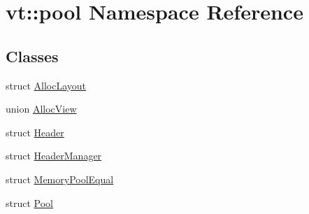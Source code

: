 \hypertarget{namespacevt_1_1pool}{}\section{vt\+:\+:pool Namespace Reference}
\label{namespacevt_1_1pool}
\subsection*{Classes}
\begin{DoxyCompactItemize}
\item 
struct \hyperlink{structvt_1_1pool_1_1_alloc_layout}{Alloc\+Layout}
\item 
union \hyperlink{unionvt_1_1pool_1_1_alloc_view}{Alloc\+View}
\item 
struct \hyperlink{structvt_1_1pool_1_1_header}{Header}
\item 
struct \hyperlink{structvt_1_1pool_1_1_header_manager}{Header\+Manager}
\item 
struct \hyperlink{structvt_1_1pool_1_1_memory_pool_equal}{Memory\+Pool\+Equal}
\item 
struct \hyperlink{structvt_1_1pool_1_1_pool}{Pool}
\end{DoxyCompactItemize}
